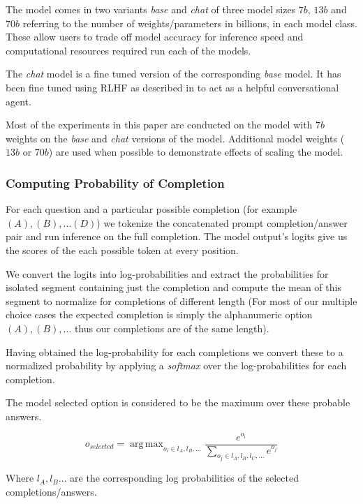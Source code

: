 \documentclass[11pt]{article}
\DeclareMathOperator*{\argmax}{arg\,max}
\begin{document}
The model comes in two variants \emph{base} and \emph{chat} of three 
model sizes $7b$, $13b$ and $70b$ referring to the number of weights/parameters in billions, 
in each model class. These allow users to trade off model accuracy for inference speed 
and computational resources required run each of the models. 

The \emph{chat} model is a fine tuned version of the 
corresponding \emph{base} model. It has been fine tuned using 
RLHF as described in \cite{ouyang2022training} to act 
as a helpful conversational agent.

Most of the experiments in this paper are conducted on the model 
with $7b$ weights on the \emph{base} and \emph{chat} versions of 
the model. Additional model weights ($13b$ or $70b$) 
are used when possible to demonstrate effects of scaling 
the model.

\subsubsection{Computing Probability of Completion}

For each question and a particular possible completion 
(for example $(A), (B), \dots (D)$)  we tokenize the concatenated 
prompt completion/answer pair and run inference on the full completion. 
The model output's logits give us the scores of the each 
possible token at every position. 

We convert the logits into log-probabilities and extract the probabilities for 
isolated segment containing just the completion and compute the mean of this segment to 
normalize for completions of different length (For most of our multiple choice cases 
the expected completion is simply the alphanumeric option $(A), (B), \dots $ 
thus our completions are of the same length).

Having obtained the log-probability for each completions we convert these to 
a normalized probability by applying a \emph{softmax} over the log-probabilities 
for each completion. 

The model selected option is considered to be the maximum over 
these probable answers. 

\begin{equation}
    o_{selected} = \argmax_{o_i \in l_A, l_B, \dots}  
    \frac{e^{o_i}}{\sum_{o_j \in l_A, l_B, l_C, \dots} e^{o_j}} 
\end{equation}

Where $l_A, l_B\dots$ are the corresponding log probabilities of the selected completions/answers.
\end{document}
